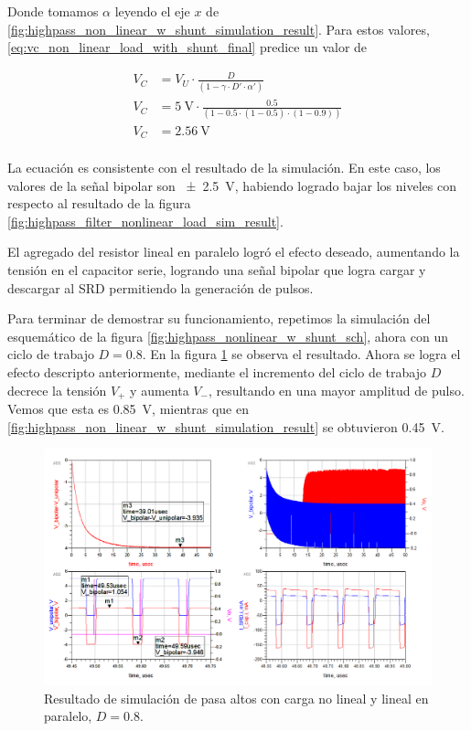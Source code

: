 Donde tomamos $\alpha$ leyendo el eje $x$ de
\ref{fig:highpass_non_linear_w_shunt_simulation_result}. Para estos valores,
\ref{eq:vc_non_linear_load_with_shunt_final} predice un valor de

\begin{equation}
    \begin{aligned}
        V_C &= V_U \cdot \frac{D}{\left( 1 - \gamma \cdot D' \cdot \alpha'\right)} \\
        V_C &= \qty{5}{\volt} \cdot \frac{0.5}{\left( 1 - 0.5 \cdot (1-0.5)
        \cdot (1-0.9) \right)} \\
        V_C &= \qty{2.56}{\volt} \\
    \end{aligned}
\end{equation}

La ecuación es consistente con el resultado de la simulación. En este caso, los
valores de la señal bipolar son \qty{\pm2.5}{\volt}, habiendo logrado bajar los
niveles con respecto al resultado de la figura
\ref{fig:highpass_filter_nonlinear_load_sim_result}.

El agregado del resistor lineal en paralelo logró el efecto deseado, aumentando
la tensión en el capacitor serie, logrando una señal bipolar que logra cargar y
descargar al SRD permitiendo la generación de pulsos.

Para terminar de demostrar su funcionamiento, repetimos la simulación del
esquemático de la figura \ref{fig:highpass_nonlinear_w_shunt_sch}, ahora con un
ciclo de trabajo $D=0.8$. En la figura
\ref{fig:highpass_non_linear_w_shunt_simulation_result_80_dc} se observa el
resultado. Ahora se logra el efecto descripto anteriormente, mediante el
incremento del ciclo de trabajo $D$ decrece la tensión $V_{+}$ y aumenta
$V_{-}$, resultando en una mayor amplitud de pulso. Vemos que esta es
\qty{0.85}{\volt}, mientras que en
\ref{fig:highpass_non_linear_w_shunt_simulation_result} se obtuvieron
\qty{0.45}{\volt}.

\begin{figure}[tbp]
    \centering
    \includegraphics[width=\textwidth]{images/highpass_nonlinear_w_shunt_sim_result_80_dc.png}
    \caption{Resultado de simulación de pasa altos con carga no lineal y lineal
    en paralelo, $D=0.8$.}
    \label{fig:highpass_non_linear_w_shunt_simulation_result_80_dc}
\end{figure}

